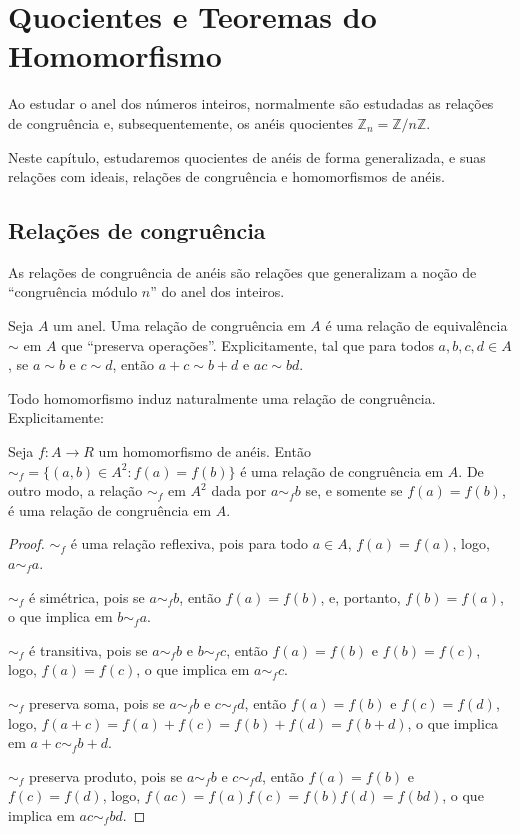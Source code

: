 \chapter{Quocientes e Teoremas do Homomorfismo}

Ao estudar o anel dos números inteiros, normalmente são estudadas as relações de congruência e, subsequentemente, os anéis quocientes $\mathbb Z_n=\mathbb Z/n\mathbb Z$.

Neste capítulo, estudaremos quocientes de anéis de forma generalizada, e suas relações com ideais, relações de congruência e homomorfismos de anéis.

\section{Relações de congruência}
As relações de congruência de anéis são relações que generalizam a noção de ``congruência módulo $n$'' do anel dos inteiros.

\begin{definition}
    Seja $A$ um anel. Uma relação de congruência em $A$ é uma relação de equivalência $\sim$ em $A$ que ``preserva operações''. Explicitamente, tal que para todos $a, b, c, d \in A$, se $a\sim b$ e $c\sim d$, então $a+c\sim b+d$ e $ac\sim bd$.
\end{definition}

Todo homomorfismo induz naturalmente uma relação de congruência. Explicitamente:

\begin{prop}
Seja $f: A\rightarrow R$ um homomorfismo de anéis. Então $\sim_f=\{(a, b) \in A^2: f(a)=f(b)\}$ é uma relação de congruência em $A$. De outro modo, a relação $\sim_f$ em $A^2$ dada por $a \sim_f b$ se, e somente se $f(a)=f(b)$, é uma relação de congruência em $A$.
\end{prop}

\begin{proof}
    $\sim_f$ é uma relação reflexiva, pois para todo $a \in A$, $f(a)=f(a)$, logo, $a\sim_f a$.

    $\sim_f$ é simétrica, pois se $a\sim_f b$, então $f(a)=f(b)$, e, portanto, $f(b)=f(a)$, o que implica em $b\sim_f a$.

    $\sim_f$ é transitiva, pois se $a\sim_f b$ e $b\sim_f c$, então $f(a)=f(b)$ e $f(b)=f(c)$, logo, $f(a)=f(c)$, o que implica em $a\sim_f c$.

    $\sim_f$ preserva soma, pois se $a\sim_f b$ e $c\sim_f d$, então $f(a)=f(b)$ e $f(c)=f(d)$, logo, $f(a+c)=f(a)+f(c)=f(b)+f(d)=f(b+d)$, o que implica em $a+c\sim_f b+d$.

    $\sim_f$ preserva produto, pois se $a\sim_f b$ e $c\sim_f d$, então $f(a)=f(b)$ e $f(c)=f(d)$, logo, $f(ac)=f(a)f(c)=f(b)f(d)=f(bd)$, o que implica em $ac\sim_f bd$.
\end{proof}

